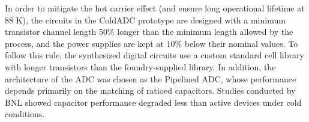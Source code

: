 In order to mitigate the hot carrier effect (and ensure long operational lifetime at 88 K), the circuits in the ColdADC prototype
are designed with a minimum transistor channel 
length 50\% longer than the minimum length allowed by the process, and the power supplies are kept at 10\% below their nominal 
values. To follow this rule, the synthesized digital circuits use a custom standard cell library with longer 
transistors than the foundry-supplied library. In addition, the architecture of the ADC was chosen as the Pipelined ADC, whose 
performance depends primarily on the matching of ratioed capacitors. Studies conducted by BNL showed capacitor performance 
degraded less than active devices under cold conditions. 
